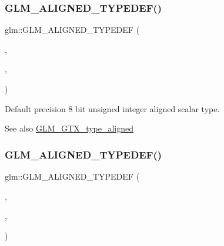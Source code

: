 \subsubsection{\texorpdfstring{G\+L\+M\+\_\+\+A\+L\+I\+G\+N\+E\+D\+\_\+\+T\+Y\+P\+E\+D\+E\+F()}{GLM\_ALIGNED\_TYPEDEF()}\hspace{0.1cm}{\footnotesize\ttfamily [109/209]}}
{\footnotesize\ttfamily glm\+::\+G\+L\+M\+\_\+\+A\+L\+I\+G\+N\+E\+D\+\_\+\+T\+Y\+P\+E\+D\+EF (\begin{DoxyParamCaption}\item[{\hyperlink{group__gtc__type__precision_ga93adf6dd9803408f3e3aaf9dedda352b}{uint8\+\_\+t}}]{,  }\item[{aligned\+\_\+uint8\+\_\+t}]{,  }\item[{1}]{ }\end{DoxyParamCaption})}

Default precision 8 bit unsigned integer aligned scalar type. \begin{DoxySeeAlso}{See also}
\hyperlink{group__gtx__type__aligned}{G\+L\+M\+\_\+\+G\+T\+X\+\_\+type\+\_\+aligned} 
\end{DoxySeeAlso}
\mbox{\label{group__gtx__type__aligned_gafbc7fb7847bfc78a339d1d371c915c73}} 
\subsubsection{\texorpdfstring{G\+L\+M\+\_\+\+A\+L\+I\+G\+N\+E\+D\+\_\+\+T\+Y\+P\+E\+D\+E\+F()}{GLM\_ALIGNED\_TYPEDEF()}\hspace{0.1cm}{\footnotesize\ttfamily [110/209]}}
{\footnotesize\ttfamily glm\+::\+G\+L\+M\+\_\+\+A\+L\+I\+G\+N\+E\+D\+\_\+\+T\+Y\+P\+E\+D\+EF (\begin{DoxyParamCaption}\item[{\hyperlink{group__gtc__type__precision_gac4eb4f43cae8129b00086dc234d3b8fc}{uint16\+\_\+t}}]{,  }\item[{aligned\+\_\+uint16\+\_\+t}]{,  }\item[{2}]{ }\end{DoxyParamCaption})}


